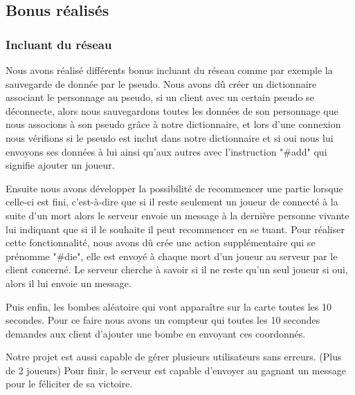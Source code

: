 \documentclass[12pt]{article}
\begin{document}
        \subsection{Bonus réalisés}
            \subsubsection{Incluant du réseau}
            Nous avons réalisé différents bonus incluant du réseau comme par exemple la sauvegarde de donnée par le pseudo. Nous avons dû créer un dictionnaire associant le personnage au pseudo,
            si un client avec un certain pseudo se déconnecte, alors nous sauvegardons toutes les données de son personnage que nous associons à son pseudo grâce à notre dictionnaire, et lors d'une connexion nous vérifions si le pseudo est inclut dans notre dictionnaire et si oui nous lui envoyons ses données à lui ainsi qu'aux autres avec l'instruction "#add" qui signifie ajouter un joueur.

            Ensuite nous avons développer la possibilité de recommencer une partie lorsque celle-ci est fini, c'est-à-dire que si il reste seulement un joueur de connecté à la suite d'un mort alors le serveur envoie un message à la dernière personne vivante lui indiquant que si il le souhaite il peut recommencer en se tuant. Pour réaliser cette fonctionnalité, nous avons dû crée une action supplémentaire qui se prénomme "#die", elle est envoyé à chaque mort d'un joueur au serveur par le client concerné. Le serveur cherche à savoir si il ne reste qu'un seul joueur si oui, alors il lui envoie un message.

            Puis enfin, les bombes aléatoire qui vont apparaître sur la carte toutes les 10 secondes. Pour ce faire nous avons un compteur qui toutes les 10 secondes demandes aux client d'ajouter une bombe en envoyant ces coordonnés.

            Notre projet est aussi capable de gérer plusieurs utilisateurs sans erreurs. (Plus de 2 joueurs)
            Pour finir, le serveur est capable d'envoyer au gagnant un message pour le féliciter de sa victoire.
\end{document}
